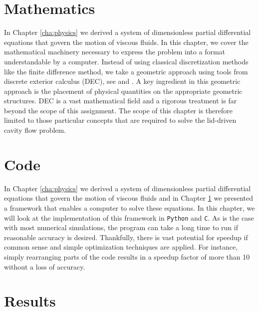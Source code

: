\documentclass[a4paper, 11pt, toc=bibliography, parskip=half]{scrreprt}
\begin{document}



\chapter{Mathematics}
\label{cha:mathematics}

In Chapter \ref{cha:physics} we derived a system of dimensionless partial differential equations that govern the motion of viscous fluids. In this chapter, we cover the mathematical machinery necessary to express the problem into a format understandable by a computer. Instead of using classical discretization methods like the finite difference method, we take a geometric approach using tools from discrete exterior calculus (DEC), see \parencite{frankel2012geometry} and \parencite{hirani2003discrete}. A key ingredient in this geometric approach is the placement of physical quantities on the appropriate geometric structures. DEC is a vast mathematical field and a rigorous treatment is far beyond the scope of this assignment. The scope of this chapter is therefore limited to those particular concepts that are required to solve the lid-driven cavity flow problem.







\chapter{Code}
\label{cha:code}

In Chapter \ref{cha:physics} we derived a system of dimensionless partial differential equations that govern the motion of viscous fluids and in Chapter \ref{cha:mathematics} we presented a framework that enables a computer to solve these equations. In this chapter, we will look at the implementation of this framework in \texttt{Python} and \texttt{C}. As is the case with most numerical simulations, the program can take a long time to run if reasonable accuracy is desired. Thankfully, there is vast potential for speedup if common sense and simple optimization techniques are applied. For instance, simply rearranging parts of the code results in a speedup factor of more than 10 without a loss of accuracy.





\chapter{Results}
\label{cha:results}
\end{document}
